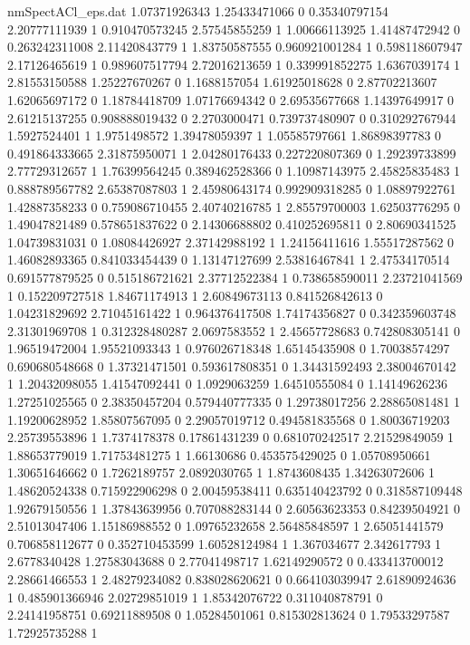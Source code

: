 \begin{filecontents}{nmSpectACl_eps.dat}
1.07371926343 1.25433471066 0
0.35340797154 2.20777111939 1
0.910470573245 2.57545855259 1
1.00666113925 1.41487472942 0
0.263242311008 2.11420843779 1
1.83750587555 0.960921001284 1
0.598118607947 2.17126465619 1
0.989607517794 2.72016213659 1
0.339991852275 1.6367039174 1
2.81553150588 1.25227670267 0
1.1688157054 1.61925018628 0
2.87702213607 1.62065697172 0
1.18784418709 1.07176694342 0
2.69535677668 1.14397649917 0
2.61215137255 0.908888019432 0
2.2703000471 0.739737480907 0
0.310292767944 1.5927524401 1
1.9751498572 1.39478059397 1
1.05585797661 1.86898397783 0
0.491864333665 2.31875950071 1
2.04280176433 0.227220807369 0
1.29239733899 2.77729312657 1
1.76399564245 0.389462528366 0
1.10987143975 2.45825835483 1
0.888789567782 2.65387087803 1
2.45980643174 0.992909318285 0
1.08897922761 1.42887358233 0
0.759086710455 2.40740216785 1
2.85579700003 1.62503776295 0
1.49047821489 0.578651837622 0
2.14306688802 0.410252695811 0
2.80690341525 1.04739831031 0
1.08084426927 2.37142988192 1
1.24156411616 1.55517287562 0
1.46082893365 0.841033454439 0
1.13147127699 2.53816467841 1
2.47534170514 0.691577879525 0
0.515186721621 2.37712522384 1
0.738658590011 2.23721041569 1
0.152209727518 1.84671174913 1
2.60849673113 0.841526842613 0
1.04231829692 2.71045161422 1
0.964376417508 1.74174356827 0
0.342359603748 2.31301969708 1
0.312328480287 2.0697583552 1
2.45657728683 0.742808305141 0
1.96519472004 1.95521093343 1
0.976026718348 1.65145435908 0
1.70038574297 0.690680548668 0
1.37321471501 0.593617808351 0
1.34431592493 2.38004670142 1
1.20432098055 1.41547092441 0
1.0929063259 1.64510555084 0
1.14149626236 1.27251025565 0
2.38350457204 0.579440777335 0
1.29738017256 2.28865081481 1
1.19200628952 1.85807567095 0
2.29057019712 0.494581835568 0
1.80036719203 2.25739553896 1
1.7374178378 0.17861431239 0
0.681070242517 2.21529849059 1
1.88653779019 1.71753481275 1
1.66130686 0.453575429025 0
1.05708950661 1.30651646662 0
1.7262189757 2.0892030765 1
1.8743608435 1.34263072606 1
1.48620524338 0.715922906298 0
2.00459538411 0.635140423792 0
0.318587109448 1.92679150556 1
1.37843639956 0.707088283144 0
2.60563623353 0.84239504921 0
2.51013047406 1.15186988552 0
1.09765232658 2.56485848597 1
2.65051441579 0.706858112677 0
0.352710453599 1.60528124984 1
1.367034677 2.342617793 1
2.6778340428 1.27583043688 0
2.77041498717 1.62149290572 0
0.433413700012 2.28661466553 1
2.48279234082 0.838028620621 0
0.664103039947 2.61890924636 1
0.485901366946 2.02729851019 1
1.85342076722 0.311040878791 0
2.24141958751 0.69211889508 0
1.05284501061 0.815302813624 0
1.79533297587 1.72925735288 1

\end{filecontents}
